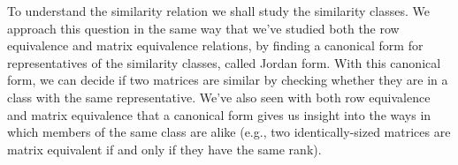 To understand the similarity relation we shall study the similarity classes.
We approach this question in the same way that we've studied both the
row equivalence and matrix equivalence relations, by finding
a canonical form for
representatives %
of the similarity classes, called Jordan form.
With this canonical form, we can decide if two matrices are similar by checking
whether they are in a class with the same representative.
We've also seen with both row equivalence and matrix equivalence that a
canonical form gives us insight into the ways in which members of
the same class are alike
(e.g., two identically-sized matrices are matrix equivalent
if and only if they have the same rank).

